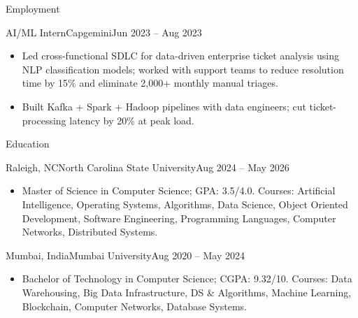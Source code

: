 \documentclass[]{mcdowellcv}
\begin{document}
\begin{cvsection}{Employment}
  \begin{cvsubsection}{AI/ML Intern}{Capgemini}{Jun 2023 -- Aug 2023}
    \begin{itemize}
      \item Led cross-functional SDLC for data-driven enterprise ticket analysis using NLP classification models; worked with support teams to reduce resolution time by 15\% and eliminate 2,000+ monthly manual triages.
      \item Built Kafka + Spark + Hadoop pipelines with data engineers; cut ticket-processing latency by 20\% at peak load.
    \end{itemize}
    \vspace{-1.5pt}
  \end{cvsubsection}
\end{cvsection}

\begin{cvsection}{Education}
  \begin{cvsubsection}{Raleigh, NC}{North Carolina State University}{Aug 2024 -- May 2026}
    \begin{itemize}
      \item Master of Science in Computer Science; GPA: 3.5/4.0. Courses: Artificial Intelligence, Operating Systems, Algorithms, Data Science, Object Oriented Development, Software Engineering, Programming Languages, Computer Networks, Distributed Systems.
    \end{itemize}
    \vspace{-1.5pt}
  \end{cvsubsection}

  \begin{cvsubsection}{Mumbai, India}{Mumbai University}{Aug 2020 -- May 2024}
    \begin{itemize}
      \item Bachelor of Technology in Computer Science; CGPA: 9.32/10. Courses: Data Warehousing, Big Data Infrastructure, DS \& Algorithms, Machine Learning, Blockchain, Computer Networks, Database Systems.
    \end{itemize}
    \vspace{-1.5pt}
  \end{cvsubsection}
\end{cvsection}
\end{document}
